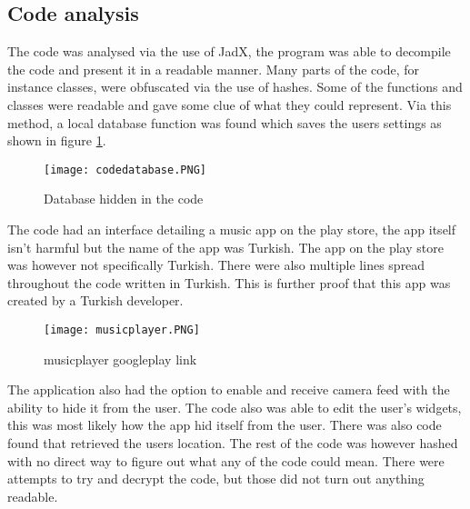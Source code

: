 \subsection{Code analysis}

The code was analysed via the use of JadX, the program was able to decompile the code and present it in a readable manner. 
Many parts of the code, for instance classes, were obfuscated via the use of hashes.
Some of the functions and classes were readable and gave some clue of what they could represent. 
Via this method, a local database function was found which saves the users settings as shown in figure \ref{tim-database}.

\begin{figure}[H]
    \texttt{[image: codedatabase.PNG]}
    \caption{Database hidden in the code}
    \label{tim-database}
\end{figure}

The code had an interface detailing a music app on the play store, the app itself isn’t harmful but the name of the app was Turkish. 
The app on the play store was however not specifically Turkish. 
There were also multiple lines spread throughout the code written in Turkish. 
This is further proof that this app was created by a Turkish developer.

\begin{figure}[H]
    \texttt{[image: musicplayer.PNG]}
    \caption{musicplayer googleplay link}
    \label{tim-music}
\end{figure}

The application also had the option to enable and receive camera feed with the ability to hide it from the user. 
The code also was able to edit the user’s widgets, this was most likely how the app hid itself from the user. 
There was also code found that retrieved the users location. 
The rest of the code was however hashed with no direct way to figure out what any of the code could mean. 
There were attempts to try and decrypt the code, but those did not turn out anything readable.
